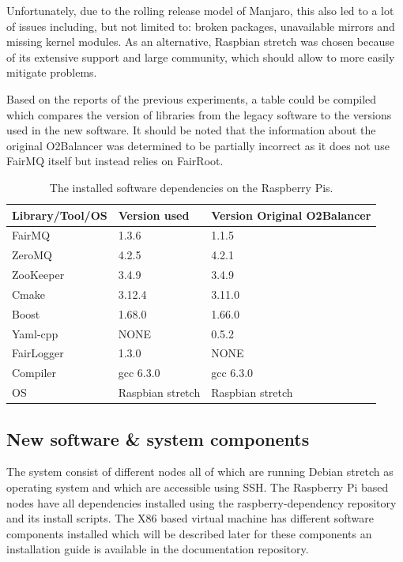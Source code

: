 \documentclass[]{article}
\begin{document}
Unfortunately, due to the rolling release model of Manjaro, this also led to a lot of issues including, but not limited to: broken packages, unavailable mirrors and missing kernel modules. As an alternative, Raspbian stretch was chosen because of its extensive support and large community, which should allow to more easily mitigate problems.

Based on the reports of the previous experiments, a table could be compiled which compares the version of libraries from the legacy software to the versions used in the new software. It should be noted that the information about the original O2Balancer was determined to be partially incorrect as it does not use FairMQ itself but instead relies on FairRoot.

\begin{table}[H]
	\begin{center}
		\begin{tabular}{ | l | l | l | }
			\hline			
			\textbf{Library/Tool/OS} & \textbf{Version used} & \textbf{Version Original O2Balancer} \\ \hline
			
			FairMQ & 1.3.6 & 1.1.5 \\ \hline
			ZeroMQ & 4.2.5 & 4.2.1 \\ \hline
			ZooKeeper & 3.4.9 & 3.4.9 \\ \hline
			Cmake & 3.12.4 & 3.11.0 \\ \hline
			Boost & 1.68.0 & 1.66.0 \\ \hline
			Yaml-cpp & NONE & 0.5.2 \\ \hline
			FairLogger & 1.3.0 & NONE \\ \hline
			Compiler & gcc 6.3.0 & gcc 6.3.0 \\	\hline
			OS & Raspbian stretch & Raspbian stretch \\ \hline
		\end{tabular}
		\caption{The installed software dependencies on the Raspberry Pis.}
		\label{tab:librabies}
	\end{center}
\end{table}

\subsection{New software \& system components}
The system consist of different nodes all of which are running Debian stretch as operating system and which are accessible using SSH. The Raspberry Pi based nodes have all dependencies installed using the raspberry-dependency repository and its install scripts. The X86 based virtual machine has different software components installed which will be described later for these components an installation guide is available in the documentation repository.
\end{document}
